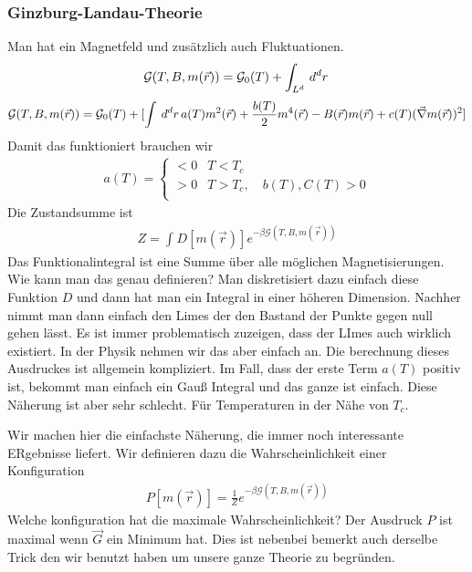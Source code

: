 \begin{description}
\subsubsection*{Ginzburg-Landau-Theorie}
Man hat ein Magnetfeld und zusätzlich auch Fluktuationen.
%
\begin{align*}
  \mathcal{G}(T, B, m(\vec{r})) = \mathcal{G}_0(T) + \int_{L^d}^{} \,d^d r\,
\end{align*}
%
%
\begin{align*}
  \mathcal{G}(T, B, m(\vec{r})) = \mathcal{G}_0 (T) + [\int_{}^{} \,d^d r\, a(T) m^2(\vec{r})
    + \frac{b(T)}{2} m^4(\vec{r}) - B(\vec{r}) m(\vec{r}) + c(T) (\vec{\nabla} m(\vec{r}))^2
]
\end{align*}
%
Damit das funktioniert brauchen wir
%
\begin{align*}
  a(T) = \begin{cases}
    < 0 & T < T_c \\
    > 0 & T > T_c, \quad b(T), C(T) > 0 \\
  \end{cases}
\end{align*}
%
Die Zustandsumme ist
%
\begin{align*}
  Z  = \int_{}^{} D\left[ m(\vec{r}) \right] e^{-\beta \mathcal{G}(T, B, m(\vec{r}))}
\end{align*}
%
Das Funktionalintegral ist eine Summe über alle möglichen Magnetisierungen.
Wie kann man das genau definieren? Man diskretisiert dazu einfach diese Funktion
$D$ und dann hat man ein Integral in einer höheren Dimension. Nachher nimmt
man dann einfach den Limes der den Bastand der Punkte gegen null gehen lässt.
Es ist immer problematisch zuzeigen, dass der LImes auch wirklich existiert.
In der Physik nehmen wir das aber einfach an. Die berechnung dieses Ausdruckes ist allgemein
kompliziert. Im Fall, dass der erste Term $a(T)$ positiv ist, bekommt man einfach
ein Gauß Integral und das ganze ist einfach. Diese Näherung ist aber sehr schlecht.
Für Temperaturen in der Nähe von $T_c$.

Wir machen hier die einfachste Näherung, die immer noch interessante ERgebnisse
liefert. Wir definieren dazu die Wahrscheinlichkeit einer Konfiguration
%
\begin{align*}
  P\left[ m(\vec{r}) \right] = \frac{1}{Z} e^{-\beta \mathcal{G}(T, B, m(\vec{r}))}
\end{align*}
%
Welche konfiguration hat die maximale Wahrscheinlichkeit? Der Ausdruck $P$
ist maximal wenn $\vec{G}$ ein Minimum hat. Dies ist nebenbei bemerkt auch
derselbe Trick den wir benutzt haben um unsere ganze Theorie zu begründen.


\end{description}
